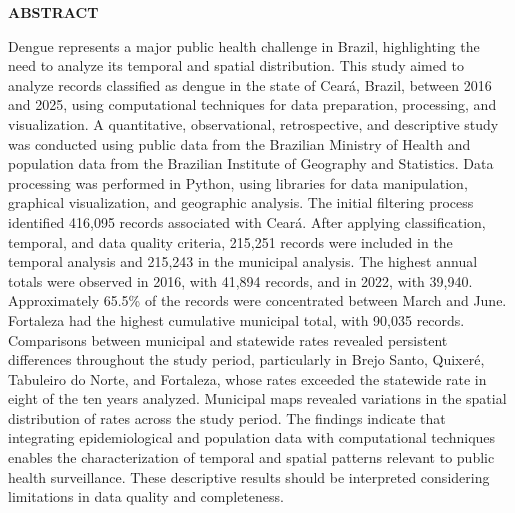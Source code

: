 
\vspace{1em}
\begin{center}
    \textbf{ABSTRACT}
\end{center}

\noindent
Dengue represents a major public health challenge in Brazil, highlighting the need to analyze its temporal and spatial distribution. This study aimed to analyze records classified as dengue in the state of Ceará, Brazil, between 2016 and 2025, using computational techniques for data preparation, processing, and visualization. A quantitative, observational, retrospective, and descriptive study was conducted using public data from the Brazilian Ministry of Health and population data from the Brazilian Institute of Geography and Statistics. Data processing was performed in Python, using libraries for data manipulation, graphical visualization, and geographic analysis. The initial filtering process identified 416,095 records associated with Ceará. After applying classification, temporal, and data quality criteria, 215,251 records were included in the temporal analysis and 215,243 in the municipal analysis. The highest annual totals were observed in 2016, with 41,894 records, and in 2022, with 39,940. Approximately 65.5\% of the records were concentrated between March and June. Fortaleza had the highest cumulative municipal total, with 90,035 records. Comparisons between municipal and statewide rates revealed persistent differences throughout the study period, particularly in Brejo Santo, Quixeré, Tabuleiro do Norte, and Fortaleza, whose rates exceeded the statewide rate in eight of the ten years analyzed. Municipal maps revealed variations in the spatial distribution of rates across the study period. The findings indicate that integrating epidemiological and population data with computational techniques enables the characterization of temporal and spatial patterns relevant to public health surveillance. These descriptive results should be interpreted considering limitations in data quality and completeness.

\vspace{0.5cm}

